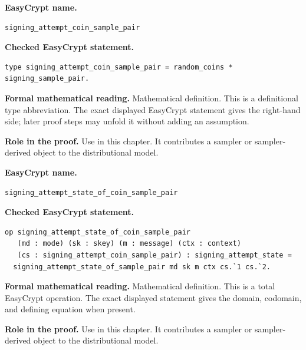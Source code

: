 \begin{formaldefinition}
\noindent\textbf{EasyCrypt name.}
\begin{lstlisting}[language=EasyCrypt,basicstyle=\ttfamily\scriptsize]
signing_attempt_coin_sample_pair
\end{lstlisting}
\noindent\textbf{Checked EasyCrypt statement.}
\begin{lstlisting}[language=EasyCrypt,basicstyle=\ttfamily\scriptsize]
type signing_attempt_coin_sample_pair = random_coins * signing_sample_pair.
\end{lstlisting}
\noindent\textbf{Formal mathematical reading.}
Mathematical definition. This is a definitional type abbreviation.  The exact displayed EasyCrypt statement gives the right-hand side; later proof steps may unfold it without adding an assumption.

\noindent\textbf{Role in the proof.}
Use in this chapter. It contributes a sampler or sampler-derived object to the distributional model.

\end{formaldefinition}

\begin{formaldefinition}
\noindent\textbf{EasyCrypt name.}
\begin{lstlisting}[language=EasyCrypt,basicstyle=\ttfamily\scriptsize]
signing_attempt_state_of_coin_sample_pair
\end{lstlisting}
\noindent\textbf{Checked EasyCrypt statement.}
\begin{lstlisting}[language=EasyCrypt,basicstyle=\ttfamily\scriptsize]
op signing_attempt_state_of_coin_sample_pair
   (md : mode) (sk : skey) (m : message) (ctx : context)
   (cs : signing_attempt_coin_sample_pair) : signing_attempt_state =
  signing_attempt_state_of_sample_pair md sk m ctx cs.`1 cs.`2.
\end{lstlisting}
\noindent\textbf{Formal mathematical reading.}
Mathematical definition. This is a total EasyCrypt operation.  The exact displayed statement gives the domain, codomain, and defining equation when present.

\noindent\textbf{Role in the proof.}
Use in this chapter. It contributes a sampler or sampler-derived object to the distributional model.

\end{formaldefinition}

